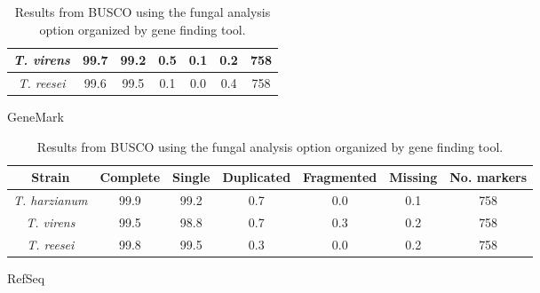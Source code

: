 \begin{table}
\begin{center}
\begin{subtable}{\textwidth}
\begin{tabular}{|c|c|c|c|c|c|c|}
        \textit{T. virens} & 99.7 & 99.2 & 0.5 & 0.1 & 0.2 & 758 \\ \hline
        \textit{T. reesei} & 99.6 & 99.5 & 0.1 & 0.0 & 0.4 & 758 \\ \hline
      \end{tabular}
      \caption{GeneMark}
    \end{subtable}
    \begin{subtable}{\textwidth}
      \centering
      \begin{tabular}{|c|c|c|c|c|c|c|}
        \hline
        Strain & Complete & Single & Duplicated & Fragmented & Missing & No. markers \\ \hline
        \textit{T. harzianum} & 99.9 & 99.2 & 0.7 & 0.0 & 0.1 & 758 \\ \hline
        \textit{T. virens} & 99.5 & 98.8 & 0.7 & 0.3 & 0.2 & 758 \\ \hline
        \textit{T. reesei} & 99.8 & 99.5 & 0.3 & 0.0 & 0.2 & 758 \\ \hline
      \end{tabular}
      \caption{RefSeq}
    \end{subtable}
  \end{center}
  \caption{Results from BUSCO using the fungal analysis option organized by gene finding tool.}
  \label{table:busco}
\end{table}


